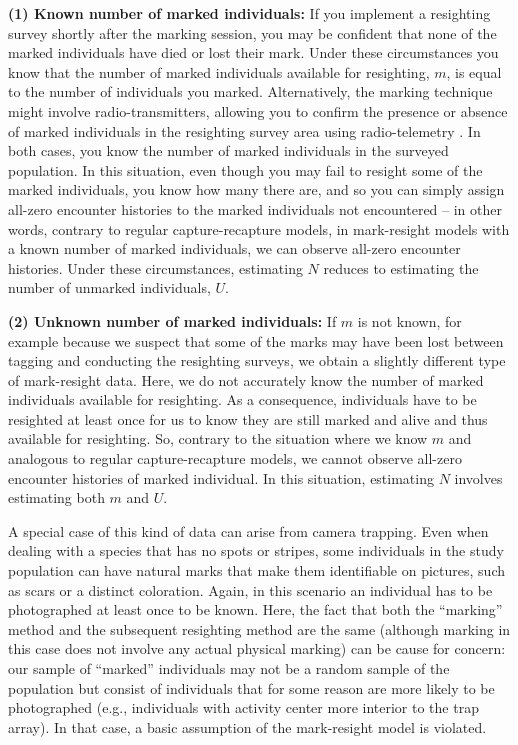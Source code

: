 {\flushleft \bf (1) Known number of marked individuals:}
If you implement a resighting survey shortly after the marking
session, you may be confident that none of the marked individuals have
died
or lost their mark. Under these circumstances you know that the
number of marked individuals available for resighting, $m$, is equal
to the number of individuals you marked. Alternatively, the marking technique
might involve
radio-transmitters, allowing you to confirm the presence or absence of
marked individuals in the resighting survey area using radio-telemetry
\citep{white_shenk:2001}. In both cases, you know the number of marked
individuals in the surveyed population.
In this situation, even though you may fail to resight some of the
marked individuals, %
you know how many there are,
and so
you can simply
assign %
all-zero encounter histories
to the marked individuals not encountered
-- in other
words, contrary to regular capture-recapture models, in mark-resight
models with a known number of marked individuals, we can observe
all-zero encounter histories. Under these circumstances, estimating
$N$ reduces to estimating the number of unmarked individuals, $U$.

{\flushleft \bf (2) Unknown number of marked individuals:}
If $m$ is not known, for example because we suspect that some of the marks may have been
lost
between
tagging and conducting the resighting surveys, we obtain a slightly
different type of mark-resight data. Here, we do not accurately know the
number of marked individuals available for resighting. As a
consequence, individuals have to be resighted at least once for us to
know they are still marked and alive and thus available for
resighting. So, contrary to the situation where we know $m$ and
analogous to regular capture-recapture models, we cannot observe
all-zero encounter histories of marked individual. In this situation, estimating
$N$ involves estimating both $m$ and $U$.

A special case of this kind of data can arise from camera
trapping. Even when dealing with a species that has no spots or
stripes, some individuals in the study population can have natural
marks that make them identifiable on pictures, such as scars or a
distinct coloration. Again, in this scenario an individual has to be
photographed at least once to be known. Here, the fact that both the
``marking'' method and the subsequent resighting method are the same
(although marking in this case does not involve any actual physical
marking) can be cause for concern: our sample of ``marked''
individuals may not be a random sample of the population but consist
of individuals that for some reason are more likely to be
photographed (e.g., individuals with activity center more interior to
the trap array). In that case, a basic assumption of the mark-resight
model is violated.

